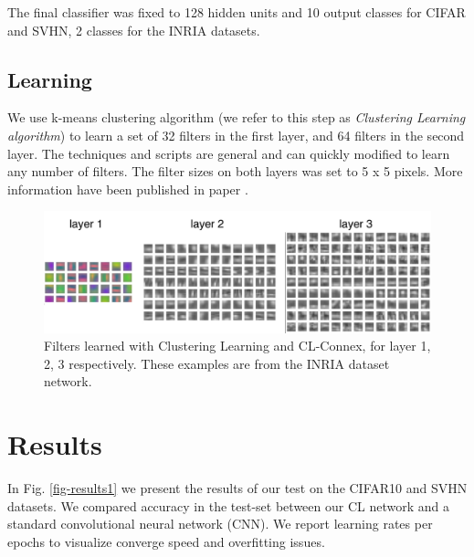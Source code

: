 \documentclass{article} %
\begin{document}
The final classifier was fixed to 128 hidden units and 10 output classes for CIFAR and SVHN, 2 classes for the INRIA datasets.



\subsection{Learning}
We use k-means clustering algorithm (we refer to this step as \textit{Clustering Learning algorithm}) to learn a set of 32 filters in the first layer, and 64 filters in the second layer. The techniques and scripts are general and can quickly modified to learn any number of filters. The filter sizes on both layers was set to 5 x 5 pixels. More information have been published in paper \cite {culurciello2013clustering}.



\begin{figure}
\includegraphics[width=5in]{fig-filters123.pdf}
\caption{Filters learned with Clustering Learning and CL-Connex, for layer 1, 2, 3 respectively. These examples are from the INRIA dataset network.}
\label{fig-filters123}
\end{figure}





\section{Results}
\label{sec-results}

In Fig. \ref{fig-results1} we present the results of our test on the CIFAR10 and SVHN datasets. We compared accuracy in the test-set between our CL network and a standard convolutional neural network (CNN). We report learning rates per epochs to visualize converge speed and overfitting issues.
\end{document}
